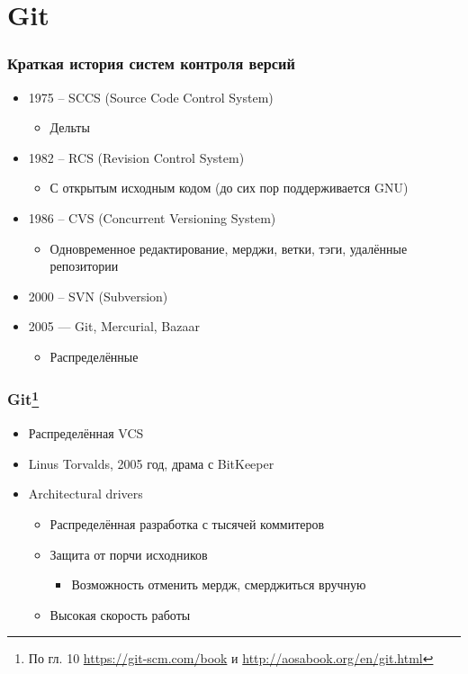 \documentclass{../../slides-style}
\author[Юрий Литвинов]{Юрий Литвинов \newline \textcolor{gray}{\small\texttt{yurii.litvinov@gmail.com}}}
\begin{document}
	
	\begin{frame}[plain]
        \titlepage
    \end{frame}

	\section{Git}

	\begin{frame}
		\frametitle{Краткая история систем контроля версий}
		\begin{itemize}
			\item 1975 -- SCCS (Source Code Control System)
			\begin{itemize}
				\item Дельты
			\end{itemize}
			\item 1982 -- RCS (Revision Control System)
			\begin{itemize}
				\item С открытым исходным кодом (до сих пор поддерживается GNU)
			\end{itemize}
			\item 1986 -- CVS (Concurrent Versioning System)
			\begin{itemize}
				\item Одновременное редактирование, мерджи, ветки, тэги, удалённые репозитории
			\end{itemize}
			\item 2000 -- SVN (Subversion)
			\item 2005 --- Git, Mercurial, Bazaar
			\begin{itemize}
				\item Распределённые
			\end{itemize}
		\end{itemize}
	\end{frame}

	\begin{frame}
		\frametitle{Git\footnote{\tiny{По гл. 10 \url{https://git-scm.com/book} и \url{http://aosabook.org/en/git.html}}}}
		\begin{itemize}
			\item Распределённая VCS
			\item Linus Torvalds, 2005 год, драма с BitKeeper
			\item Architectural drivers
			\begin{itemize}
				\item Распределённая разработка с тысячей коммитеров
				\item Защита от порчи исходников
				\begin{itemize}
					\item Возможность отменить мердж, смерджиться вручную
				\end{itemize}
				\item Высокая скорость работы
			\end{itemize}
		\end{itemize}
	\end{frame}
\end{document}
